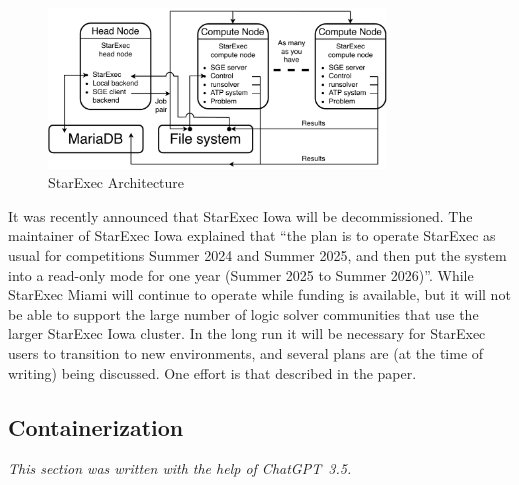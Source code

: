 \documentclass{easychair}
\begin{document}
\begin{figure}[htb]
\begin{center}
\includegraphics[width=0.8\textwidth]{ArchitectureS}
\caption{StarExec Architecture}
\label{ArchitectureS}
\end{center}
\end{figure}

It was recently announced that StarExec Iowa will be decommissioned. 
The maintainer of StarExec Iowa explained that ``the plan is to operate StarExec as usual for 
competitions Summer 2024 and Summer 2025, and then put the system into a read-only mode for one 
year (Summer 2025 to Summer 2026)''.
While StarExec Miami will continue to operate while funding is available, but it will not be able
to support the large number of logic solver communities that use the larger StarExec Iowa cluster.
In the long run it will be necessary for StarExec users to transition to new environments,
and several plans are (at the time of writing) being discussed.
One effort is that described in the paper.

\subsection{Containerization}
\label{Containerization}

{\em This section was written with the help of ChatGPT~3.5.}
\end{document}

